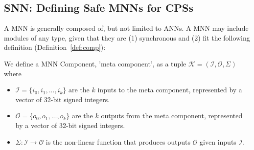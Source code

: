 \subsection{\ac{SNN}: Defining Safe \acp{MNN} for \acp{CPS}}
A \acf{MNN} is generally composed of, but not limited to \acp{ANN}.
A \ac{MNN} may include modules of any type, given that they are (1) synchronous and (2) fit the following definition (Definition~\ref{def:comp}):
\begin{definition}
	\label{def:comp}
	We define a \ac{MNN} Component, 'meta component', as a tuple $\mathcal{K} = (\mathcal{I}, \mathcal{O}, \Sigma)$ where
	\begin{itemize}
		\item $\mathcal{I} = \{i_0, i_1, ..., i_k \}$ are the $k$ inputs to the meta component, represented by a vector of 32-bit signed integers.
		\item $\mathcal{O} = \{o_0, o_1, ..., o_k \}$ are the $k$ outputs from the meta component, represented by a vector of 32-bit signed integers.
		\item $\Sigma: \mathcal{I} \rightarrow \mathcal{O}$ is the non-linear function that produces outputs $\mathcal{O}$ given inputs $\mathcal{I}$. 
	\end{itemize}
\end{definition}


